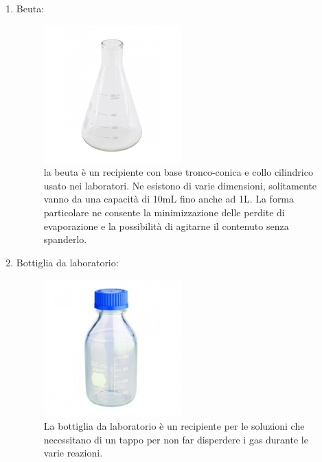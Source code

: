 \documentclass{article}
\begin{document}
\begin{enumerate}
\begin{figure}[H]
		\end{figure}

		\vspace{0.5cm}


		\item Beuta:

		\begin{figure}[H]

			\includegraphics[width=0.5\textwidth]{./immagini/beuta.jpg}
			\caption{la beuta è un recipiente con base tronco-conica e collo cilindrico usato nei laboratori.
			Ne esistono di varie dimensioni, solitamente vanno da una capacità di 10mL fino anche ad 1L.
			La forma particolare ne consente la minimizzazione delle perdite di evaporazione e la possibilità
			di agitarne il contenuto senza spanderlo.}
			\label{beuta}

		\end{figure}

		\vspace{0.5cm}

		\item Bottiglia da laboratorio:

		\begin{figure}[H]

			\includegraphics[width=0.5\textwidth]{./immagini/bottiglia.JPG}
			\caption{La bottiglia da laboratorio è un recipiente per le soluzioni che
			necessitano di un tappo per non far disperdere
			i gas durante le varie reazioni.}
			\label{bottiglia}


\end{figure}
\end{enumerate}
\end{document}
